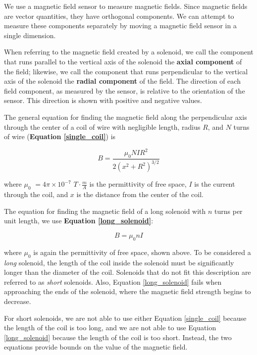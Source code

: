 We use a magnetic field sensor to measure magnetic fields. Since magnetic fields are vector quantities, they have orthogonal components. We can attempt to measure these components separately by moving a magnetic field sensor in a single dimension.

\bigskip
When referring to the magnetic field created by a solenoid, we call the component that runs parallel to the vertical axis of the solenoid the \textbf{axial component} of the field; likewise, we call the component that runs perpendicular to the vertical axis of the solenoid the \textbf{radial component} of the field. The direction of each field component, as measured by the sensor, is relative to the orientation of the sensor. This direction is shown with positive and negative values.

\bigskip
The general equation for finding the magnetic field along the perpendicular axis through the center of a coil of wire with negligible length, radius $R$, and $N$ turns of wire (\textbf{Equation \ref{single_coil}}) is

\begin{equation} \label{single_coil}
B = \frac{\mu_0 N I R^2}{2 ( x^2 + R^2 )^{3/2}}
\end{equation}

where \textbf{$\mu_0$} $= 4 \pi \times 10^{-7}$ $T \cdot \frac{m}{A}$ is the permittivity of free space, \textbf{$I$} is the current through the coil, and \textbf{$x$} is the distance from the center of the coil.

\bigskip
The equation for finding the magnetic field of a long solenoid with $n$ turns per unit length, we use \textbf{Equation \ref{long_solenoid}}:

\begin{equation} \label{long_solenoid}
B = \mu_0 n I
\end{equation}

where $\mu_0$ is again the permittivity of free space, shown above. To be considered a \textit{long} solenoid, the length of the coil inside the solenoid must be significantly longer than the diameter of the coil. Solenoids that do not fit this description are referred to as \textit{short} solenoids. Also, Equation \ref{long_solenoid} fails when approaching the ends of the solenoid, where the magnetic field strength begins to decrease.

\bigskip
For short solenoids, we are not able to use either Equation \ref{single_coil} because the length of the coil is too long, and we are not able to use Equation \ref{long_solenoid} because the length of the coil is too short. Instead, the two equations provide bounds on the value of the magnetic field.